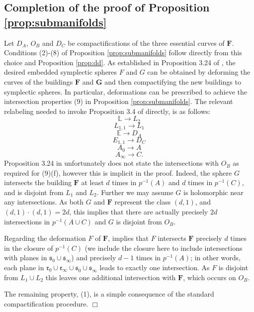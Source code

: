 \documentclass[12pt]{amsart}
\theoremstyle{definition}
\begin{document}
\subsection{Completion of the proof of Proposition \ref{prop:submanifolds}}
\label{sub:shift}

Let $D_A$, $O_B$ and $D_C$ be compactifications of the three essential curves of $\mathbf{F}$. Conditions (2)-(8) of Proposition \ref{prop:submanifolds} follow directly from this choice and Proposition \ref{prop:dd}. As established in Proposition 3.24 of \cite{hiker},  the desired embedded symplectic spheres $F$ and $G$ can be obtained by deforming the curves of the buildings $\mathbf{F}$ and $\mathbf{G}$ and then compactifying the new buildings to symplectic spheres. In particular, deformations can be prescribed to achieve the intersection properties (9) in Proposition \ref{prop:submanifolds}. The relevant relabeling needed to invoke Proposition 3.4 of \cite{hiker} directly, is as follows: $$\mathbb{L} \to L_2$$ $$L_{1,1} \to L_1$$ $$\mathbb{E} \to D_A$$ $$E_{1,1} \to D_C$$ $$A_0 \to A$$ $$A_\infty \to C.$$  
Proposition 3.24 in \cite{hiker} unfortunately does not state the intersections with $O_B$ as required for (9)(f), however this is implicit in the proof. Indeed, the sphere $G$ intersects the building $\mathbf{F}$ at least $d$ times in $p^{-1}(A)$ and $d$ times in $p^{-1}(C)$, and is disjoint from $L_1$ and $L_2$. Further we may assume $G$ is holomorphic near any intersections. As both $G$ and $\mathbf{F}$ represent the class $(d,1)$, and $(d,1) \cdot (d,1) = 2d$, this implies that there are actually precisely $2d$ intersections in $p^{-1}(A \cup C)$ and $G$ is disjoint from $O_B$. 

Regarding the deformation $F$ of $\mathbf{F}$, \cite[Lemma 3.33]{hiker} implies that $F$ intersects $\mathbf{F}$ precisely $d$ times in the closure of $p^{-1}(C)$ (we include the closure here to include intersections with planes in $\mathfrak{s}_0 \cup \mathfrak{s}_{\infty}$) and precisely $d-1$ times in $p^{-1}(A)$; in other words, each plane in $\mathfrak{r}_0 \cup \mathfrak{r}_{\infty} \cup \mathfrak{s}_0 \cup \mathfrak{s}_{\infty}$ leads to exactly one intersection. As $F$ is disjoint from $L_1 \cup L_2$ this leaves one additional intersection with $\mathbf{F}$, which occurs on $O_B$.

The remaining property, (1), is a simple consequence of the standard compactification procedure. $\Box$

\end{document}
